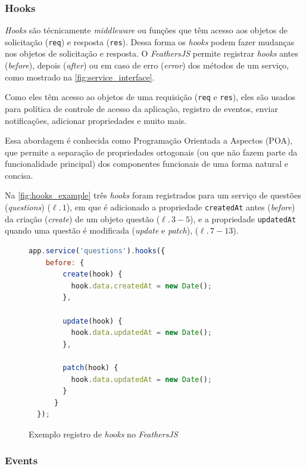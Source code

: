 \subsubsection{Hooks}

\textit{Hooks} são técnicamente \textit{middleware} ou funções que têm acesso aos
objetos de solicitação (\texttt{req}) e resposta (\texttt{res}).
Dessa forma os \textit{hooks} podem fazer mudanças nos objetos de solicitação e resposta.
O \textit{\textit{FeathersJS}} permite registrar \textit{hooks} antes (\textit{before}), depois
(\textit{after}) ou em caso de erro (\textit{error}) dos métodos de
um serviço, como mostrado na \autoref{fig:service_interface}.

Como eles têm acesso ao objetos de uma requisição (\texttt{req} e \texttt{res}), eles são usados
para política de controle de acesso da aplicação, registro de eventos, enviar
notificações, adicionar propriedades e muito mais.

Essa abordagem é conhecida como Programação Orientada a Aspectos (POA), que permite
a separação de propriedades ortogonais (ou que não fazem parte da funcionalidade
principal) dos componentes funcionais de uma forma natural e concisa.

Na \autoref{fig:hooks_example} três \textit{hooks} foram registrados para um serviço de questões (\textit{questions}) ($\ell.\,1$),
em que é adicionado a propriedade \texttt{createdAt} antes (\textit{before}) da criação (\textit{create}) de um objeto questão ($\ell.\,3-5$),
e a propriedade \texttt{updatedAt} quando uma questão é modificada (\textit{update} e \textit{patch}), ($\ell.\,7-13$).

\begin{figure}[h]
\begin{lstlisting}[language=JavaScript]
  app.service('questions').hooks({
    before: {
        create(hook) {
          hook.data.createdAt = new Date();
        },

        update(hook) {
          hook.data.updatedAt = new Date();
        },

        patch(hook) {
          hook.data.updatedAt = new Date();
        }
      }
  });
\end{lstlisting}
\caption{Exemplo registro de \textit{hooks} no \textit{\textit{FeathersJS}}}
\label{fig:hooks_example}
\end{figure}

\subsubsection{Events}

